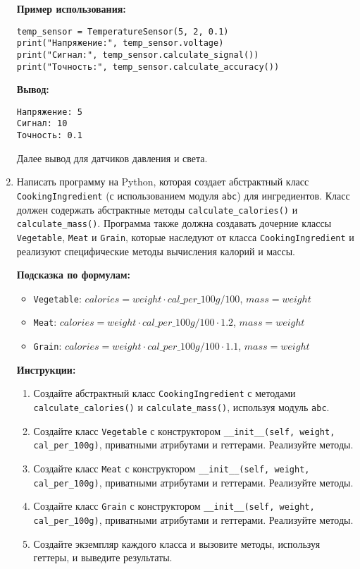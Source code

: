 \begin{enumerate}
\textbf{Пример использования:}
\begin{verbatim}
temp_sensor = TemperatureSensor(5, 2, 0.1)
print("Напряжение:", temp_sensor.voltage)
print("Сигнал:", temp_sensor.calculate_signal())
print("Точность:", temp_sensor.calculate_accuracy())
\end{verbatim}

\textbf{Вывод:}
\begin{verbatim}
Напряжение: 5
Сигнал: 10
Точность: 0.1
\end{verbatim}

Далее вывод для датчиков давления и света.

\item
Написать программу на Python, которая создает абстрактный класс \texttt{CookingIngredient} (с использованием модуля \texttt{abc}) для ингредиентов. 
Класс должен содержать абстрактные методы \texttt{calculate\_calories()} и \texttt{calculate\_mass()}. 
Программа также должна создавать дочерние классы \texttt{Vegetable}, \texttt{Meat} и \texttt{Grain}, 
которые наследуют от класса \texttt{CookingIngredient} и реализуют специфические методы вычисления калорий и массы.

\textbf{Подсказка по формулам:}
\begin{itemize}
    \item \texttt{Vegetable}: $calories = weight \cdot cal\_per\_100g / 100$, $mass = weight$
    \item \texttt{Meat}: $calories = weight \cdot cal\_per\_100g / 100 \cdot 1.2$, $mass = weight$
    \item \texttt{Grain}: $calories = weight \cdot cal\_per\_100g / 100 \cdot 1.1$, $mass = weight$
\end{itemize}

\textbf{Инструкции:}
\begin{enumerate}
    \item Создайте абстрактный класс \texttt{CookingIngredient} с методами \texttt{calculate\_calories()} и \texttt{calculate\_mass()}, используя модуль \texttt{abc}.
    \item Создайте класс \texttt{Vegetable} с конструктором \texttt{\_\_init\_\_(self, weight, cal\_per\_100g)}, приватными атрибутами и геттерами. Реализуйте методы.
    \item Создайте класс \texttt{Meat} с конструктором \texttt{\_\_init\_\_(self, weight, cal\_per\_100g)}, приватными атрибутами и геттерами. Реализуйте методы.
    \item Создайте класс \texttt{Grain} с конструктором \texttt{\_\_init\_\_(self, weight, cal\_per\_100g)}, приватными атрибутами и геттерами. Реализуйте методы.
    \item Создайте экземпляр каждого класса и вызовите методы, используя геттеры, и выведите результаты.
\end{enumerate}


\end{enumerate}
